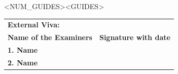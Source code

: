 \begin{center}
\renewcommand\tabularxcolumn[1]{>{\Centering}p{#1}}
\begin{tabularx}{\linewidth}{<NUM_GUIDES>}<GUIDES>
\end{tabularx}
\renewcommand\tabularxcolumn[1]{}
\end{center}
\vfill
\begin{minipage}{14.8cm}
\begin{tabularx}{\linewidth}{X c}
\textbf{External Viva:}\\
\textbf{Name of the Examiners} & \textbf{Signature with date}\\
\textbf{1. Name}\\
\vfill
\textbf{2. Name}\\
\end{tabularx}
\end{minipage}

\pagebreak